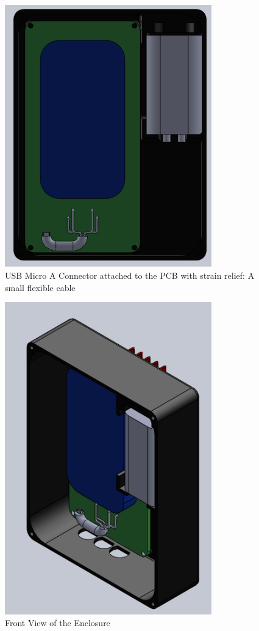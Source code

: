 \documentclass{article}
\numberwithin{figure}{section}
\numberwithin{equation}{section}
\begin{document}
{\begin{figure}[H]
	\centering
	\includegraphics[width=0.8\textwidth]{Assembly1}
	\caption{USB Micro A Connector attached to the PCB with strain relief: A small flexible cable}
	\label{fig:append_usbcable}
\end{figure}

\begin{figure}[H]
	\centering
	\includegraphics[width=0.8\textwidth]{Assembly2}
	\caption{Front View of the Enclosure}
	\label{fig:append_enclosurefront}
\end{figure}

}
\end{document}
